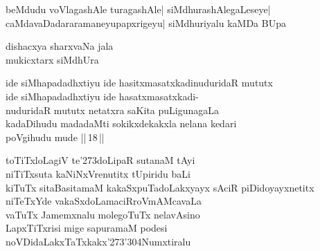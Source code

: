 \begin{entry}
\begin{shl}
beMdudu voVlagashAle turagashAle| siMdhurashAlegaLeseye|\\
caMdavaDadararamaneyupapxrigeyu| siMdhuriyalu kaMDa BUpa
\end{shl}
\end{entry}

\begin{entry}
\gl{}
\begin{shl}
dishacxya sharxvaNa jala\\
mukicxtarx siMdhUra
\end{shl}
\end{entry}

\begin{entry}
\gl{}
\begin{shl}
ide siMhapadadhxtiyu ide hasitxmasatxkadinuduridaR mututx\\
ide siMhapadadhxtiyu ide hasatxmasatxkadi-\\
nuduridaR mututx netatxra saKita puLigunagaLa\\
kadaDihudu madadaMti sokikxdekakxla nelana kedari\\
poVgihudu mude ||\,18\,||
\end{shl}
\end{entry}

\begin{entry}
\gl{}
\begin{shl}
toTiTxloLagiV te\char'273doLipaR sutanaM tAyi\\
niTiTxsuta kaNiNxVrenutitx tUpiridu baLi\\
kiTuTx sitaBasitamaM kakaSxpuTadoLakxyayx sAciR piDidoyayxnetitx\\
niTeTxYde vakaSxdoLamaciRroVmAMcavaLa\\
vaTuTx Jamemxnalu molegoTuTx nelavAsino\\
LapxTiTxrisi mige sapuramaM podesi noVDidaLakxTaTxkakx\char'273\char'304Numxtiralu
\end{shl}
\end{entry}

